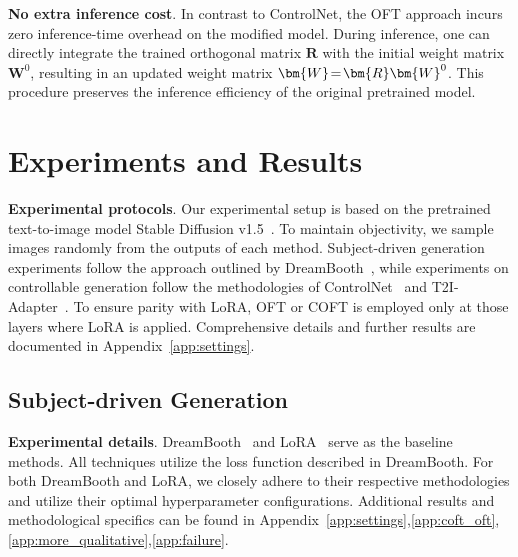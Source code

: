 \textbf{No extra inference cost}. In contrast to ControlNet, the OFT approach incurs zero inference-time overhead on the modified model. During inference, one can directly integrate the trained orthogonal matrix $\bm{R}$ with the initial weight matrix $\bm{W}^0$, resulting in an updated weight matrix $\thickmuskip=2mu \medmuskip=2mu \bm{W}=\bm{R}\bm{W}^0$. This procedure preserves the inference efficiency of the original pretrained model.

\section{Experiments and Results}

\textbf{Experimental protocols}. Our experimental setup is based on the pretrained text-to-image model Stable Diffusion v1.5~\cite{rombach2022high}. To maintain objectivity, we sample images randomly from the outputs of each method. Subject-driven generation experiments follow the approach outlined by DreamBooth~\cite{ruiz2023dreambooth}, while experiments on controllable generation follow the methodologies of ControlNet~\cite{zhang2023adding} and T2I-Adapter~\cite{mou2023t2i}. To ensure parity with LoRA, OFT or COFT is employed only at those layers where LoRA is applied. Comprehensive details and further results are documented in Appendix~\ref{app:settings}.

\subsection{Subject-driven Generation}

\textbf{Experimental details}. DreamBooth~\cite{ruiz2023dreambooth} and LoRA~\cite{hulora2022} serve as the baseline methods. All techniques utilize the loss function described in DreamBooth. For both DreamBooth and LoRA, we closely adhere to their respective methodologies and utilize their optimal hyperparameter configurations. Additional results and methodological specifics can be found in Appendix~\ref{app:settings},\ref{app:coft_oft},\ref{app:more_qualitative},\ref{app:failure}.

